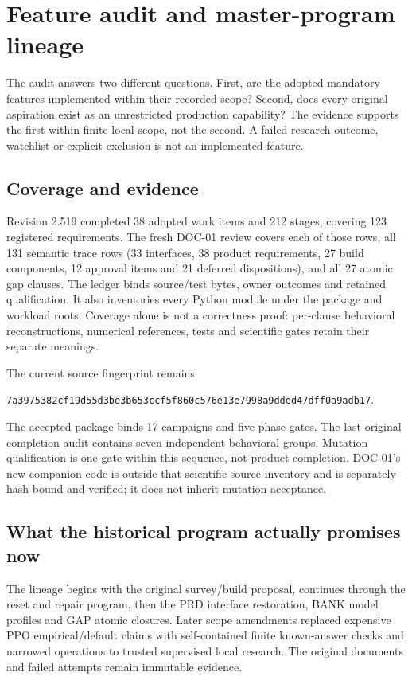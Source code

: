 \chapter{Feature audit and master-program lineage}
\label{sec:current-audit}

The audit answers two different questions. First, are the adopted mandatory
features implemented within their recorded scope? Second, does every original
aspiration exist as an unrestricted production capability? The evidence supports
the first within finite local scope, not the second. A failed research outcome,
watchlist or explicit exclusion is not an implemented feature.

\section{Coverage and evidence}

Revision 2.519 completed 38 adopted work items and 212 stages, covering 123
registered requirements. The fresh DOC-01 review covers each of those rows,
all 131 semantic trace rows (33 interfaces, 38 product requirements, 27 build
components, 12 approval items and 21 deferred dispositions), and all 27 atomic
gap clauses. The ledger binds source/test bytes, owner outcomes and retained
qualification. It also inventories every Python module under the package and
workload roots. Coverage alone is not a correctness proof: per-clause behavioral
reconstructions, numerical references, tests and scientific gates retain their
separate meanings.

The current source fingerprint remains
\begin{center}\small
\texttt{7a3975382cf19d55d3be3b653ccf5f860c576e13e7998a9dded47dff0a9adb17}.
\end{center}
The accepted package binds 17 campaigns and five phase gates. The last original
completion audit contains seven independent behavioral groups. Mutation
qualification is one gate within this sequence, not product completion.
DOC-01's new companion code is outside that scientific source inventory and
is separately hash-bound and verified; it does not inherit mutation acceptance.

\section{What the historical program actually promises now}

The lineage begins with the original survey/build proposal, continues through
the reset and repair program, then the PRD interface restoration, BANK model
profiles and GAP atomic closures. Later scope amendments replaced expensive
PPO empirical/default claims with self-contained finite known-answer checks and
narrowed operations to trusted supervised local research. The original
documents and failed attempts remain immutable evidence.

